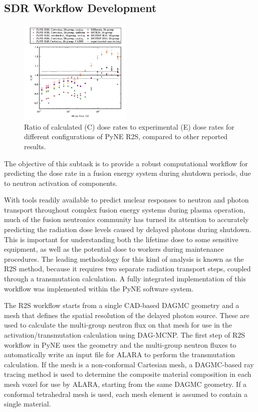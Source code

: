 \subsection{\gls{SDR} Workflow Development}

\begin{figure}
\centering
\includegraphics[width=0.48\textwidth]{imgs/r2s-validation.png}
\caption{\label{fig:r2s-validation}Ratio of calculated (C) dose rates to
  experimental (E) dose rates for different configurations of PyNE R2S,
  compared to other reported results.}
\end{figure}

The objective of this subtask is to provide a robust computational workflow
for predicting the dose rate in a fusion energy system during shutdown
periods, due to neutron activation of components.

With tools readily available to predict nuclear responses to neutron and
photon transport throughout complex fusion energy systems during plasma
operation, much of the fusion neutronics community has turned its attention to
accurately predicting the radiation dose levels caused by delayed photons
during shutdown.\cite{r2smesh,r2sccfe}  This is important for understanding
both the lifetime dose to some sensitive equipment, as well as the potential
dose to workers during maintenance procedures.  The leading methodology for
this kind of analysis is known as the \gls{R2S} method, because it requires
two separate radiation transport steps, coupled through a transmutation
calculation.\cite{various_r2s}  A fully integrated implementation of this
workflow was implemented within the PyNE software
system.\cite{pyne,pyne_r2s}

The \gls{R2S} workflow starts from a single CAD-based \gls{DAGMC} geometry and
a mesh that defines the spatial resolution of the delayed photon source.
These are used to calculate the multi-group neutron flux on that mesh for use
in the activation/transmutation calculation using DAG-MCNP.  The first step of
\gls{R2S} workflow in PyNE uses the geometry and the multi-group neutron
fluxes to automatically write an input file for ALARA\cite{alara} to perform
the transmutation calculation.  If the mesh is a non-conformal Cartesian mesh,
a \gls{DAGMC}-based ray tracing method is used to determine the composite
material composition in each mesh voxel for use by ALARA, starting from the
same \gls{DAGMC} geometry.  If a conformal tetrahedral mesh is used, each mesh
element is assumed to contain a single material.

